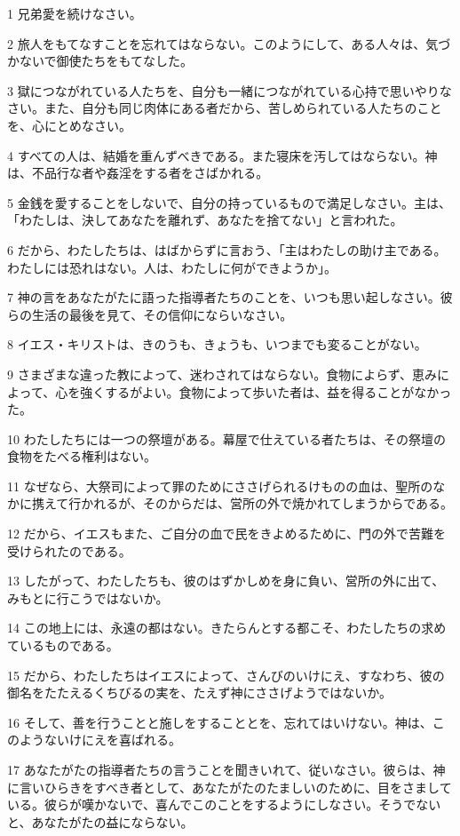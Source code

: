 \par 1 兄弟愛を続けなさい。
\par 2 旅人をもてなすことを忘れてはならない。このようにして、ある人々は、気づかないで御使たちをもてなした。
\par 3 獄につながれている人たちを、自分も一緒につながれている心持で思いやりなさい。また、自分も同じ肉体にある者だから、苦しめられている人たちのことを、心にとめなさい。
\par 4 すべての人は、結婚を重んずべきである。また寝床を汚してはならない。神は、不品行な者や姦淫をする者をさばかれる。
\par 5 金銭を愛することをしないで、自分の持っているもので満足しなさい。主は、「わたしは、決してあなたを離れず、あなたを捨てない」と言われた。
\par 6 だから、わたしたちは、はばからずに言おう、「主はわたしの助け主である。わたしには恐れはない。人は、わたしに何ができようか」。
\par 7 神の言をあなたがたに語った指導者たちのことを、いつも思い起しなさい。彼らの生活の最後を見て、その信仰にならいなさい。
\par 8 イエス・キリストは、きのうも、きょうも、いつまでも変ることがない。
\par 9 さまざまな違った教によって、迷わされてはならない。食物によらず、恵みによって、心を強くするがよい。食物によって歩いた者は、益を得ることがなかった。
\par 10 わたしたちには一つの祭壇がある。幕屋で仕えている者たちは、その祭壇の食物をたべる権利はない。
\par 11 なぜなら、大祭司によって罪のためにささげられるけものの血は、聖所のなかに携えて行かれるが、そのからだは、営所の外で焼かれてしまうからである。
\par 12 だから、イエスもまた、ご自分の血で民をきよめるために、門の外で苦難を受けられたのである。
\par 13 したがって、わたしたちも、彼のはずかしめを身に負い、営所の外に出て、みもとに行こうではないか。
\par 14 この地上には、永遠の都はない。きたらんとする都こそ、わたしたちの求めているものである。
\par 15 だから、わたしたちはイエスによって、さんびのいけにえ、すなわち、彼の御名をたたえるくちびるの実を、たえず神にささげようではないか。
\par 16 そして、善を行うことと施しをすることとを、忘れてはいけない。神は、このようないけにえを喜ばれる。
\par 17 あなたがたの指導者たちの言うことを聞きいれて、従いなさい。彼らは、神に言いひらきをすべき者として、あなたがたのたましいのために、目をさましている。彼らが嘆かないで、喜んでこのことをするようにしなさい。そうでないと、あなたがたの益にならない。
